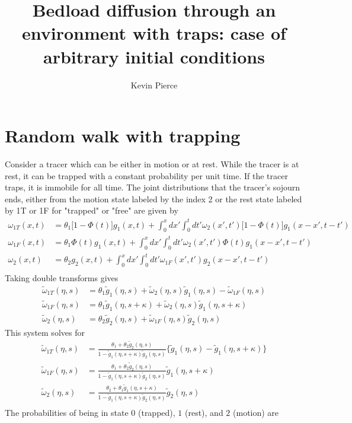 \documentclass[11pt]{article}
\newcommand\om{\omega}
\newcommand\tom{\tilde{\omega}}
\newcommand\tg{\tilde{g}}
\begin{document}
\title{Bedload diffusion through an environment with traps: 
	case of arbitrary initial conditions}
\author{Kevin Pierce}
\maketitle

\section{Random walk with trapping}
Consider a tracer which can be either in motion or at rest.
While the tracer is at rest, it can be trapped with a constant probability per unit time. 
If the tracer traps, it is immobile for all time.
The joint distributions that the tracer's sojourn ends, either from the motion state labeled by the index 2 or the rest state labeled by 1T or 1F for "trapped" or "free" are given by
\begin{align}
\om_{1T}(x,t) &= \theta_1\big[1-\Phi(t)\big]g_1(x,t) + \int_0^x dx' \int_0^t dt' \om_2(x',t')\big[1-\Phi(t)\big]g_1(x-x',t-t')\\
\om_{1F}(x,t) &= \theta_1\Phi(t)g_1(x,t) + \int_0^x dx' \int_0^t dt' \om_2(x',t') \Phi(t) g_1(x-x',t-t')\\
\om_2(x,t) &= \theta_2 g_2(x,t) + \int_0^x dx' \int_0^t dt' \om_{1F}(x',t')g_2(x-x',t-t')\\
\end{align}
Taking double transforms gives
\begin{align}
\tom_{1T}(\eta,s) &= \theta_1 \tg_1(\eta,s) + \tom_2(\eta,s)\tg_1(\eta,s)-\tom_{1F}(\eta,s) \\
\tom_{1F}(\eta,s) &= \theta_1\tg_1(\eta,s+\kappa) + \tom_2(\eta,s)\tg_1(\eta,s+\kappa)\\
\tom_2(\eta,s) &= \theta_2 \tg_2(\eta,s) + \tom_{1F}(\eta,s)\tg_2(\eta,s)
\end{align}
This system solves for 
\begin{align}
\tom_{1T}(\eta,s) &= \frac{\theta_1 + \theta_2 \tg_2(\eta,s)}{1-\tg_1(\eta,s+\kappa)\tg_2(\eta,s)}\big\{\tg_1(\eta,s)-\tg_1(\eta,s+\kappa) \big\} \\
\tom_{1F}(\eta,s) &= \frac{\theta_1 + \theta_2 \tg_2(\eta,s)}{1-\tg_1(\eta,s+\kappa)\tg_2(\eta,s)}\tg_1(\eta,s+\kappa)\\
\tom_{2}(\eta,s) &= \frac{\theta_2 + \theta_1 \tg_1(\eta,s+\kappa)}{1-\tg_1(\eta,s+\kappa)\tg_2(\eta,s)}\tg_2(\eta,s)\\
\end{align}
The probabilities of being in state $0$ (trapped), $1$ (rest), and $2$ (motion) are
\end{document}
